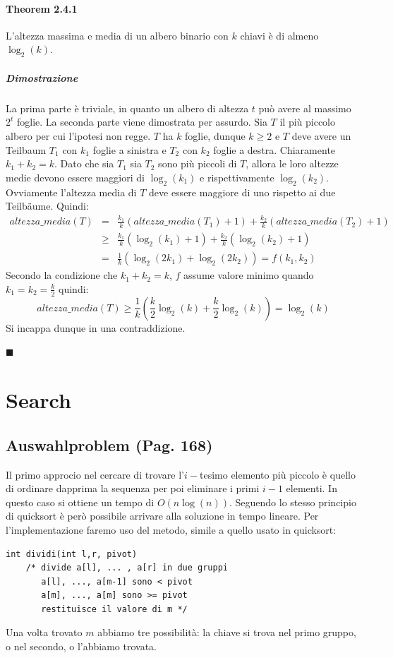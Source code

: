 \documentclass[a4paper]{book}
\newenvironment{mytheorem}[1]{\subsubsection*{Theorem #1}}{\begin{flushright}$\blacksquare$\end{flushright}}
\newcommand{\lstIndent}{4}
\begin{document}
\begin{mytheorem}{2.4.1}
L'altezza massima e media di un albero binario con $k$ chiavi è di almeno $ \log_2 (k)$.
\paragraph*{Dimostrazione}
La prima parte è triviale, in quanto un albero di altezza $t$ può avere al massimo $2^t$ foglie. La seconda parte viene dimostrata per assurdo. Sia $T$ il più piccolo albero per cui l'ipotesi non regge. $T$ ha $k$ foglie, dunque $k \geq 2$ e $T$ deve avere un Teilbaum $T_1$ con $k_1$ foglie a sinistra e $T_2$ con $k_2$ foglie a destra. Chiaramente $k_1+k_2=k$. Dato che sia $T_1$ sia $T_2$ sono più piccoli di $T$, allora le loro altezze medie devono essere maggiori di $\log_2(k_1)$ e rispettivamente $\log_2 (k_2)$. Ovviamente l'altezza media di $T$ deve essere maggiore di uno rispetto ai due Teilbäume. Quindi:
\begin{eqnarray}
 altezza\_media(T) &=&  \frac{k_1}{k}(altezza\_media(T_1)+1)+\frac{k_2}{k}(altezza\_media(T_2)+1)      \nonumber \\
   &\geq & \frac{k_1}{k}(\log_2(k_1)+1)+\frac{k_2}{k}(\log_2(k_2)+1) \nonumber \\
   &=&\frac{1}{k}(\log_2(2k_1)+\log_2(2k_2)) = f(k_1,k_2)
\end{eqnarray}
Secondo la condizione che $k_1+k_2=k$, $f$ assume valore minimo quando $k_1=k_2=\frac{k}{2}$ quindi:
$$ altezza\_media(T) \geq \frac{1}{k}\left(\frac{k}{2} \log_2(k)+\frac{k}{2} \log_2(k)\right)=\log_2 (k)$$
Si incappa dunque in una contraddizione.
\end{mytheorem}
\chapter{Search}
\section{Auswahlproblem (Pag. 168)}
Il primo approcio nel cercare di trovare l'$i-$tesimo elemento più piccolo è quello di ordinare dapprima la sequenza per poi eliminare i primi $i-1$ elementi. In questo caso si ottiene un tempo di $O(n \log (n))$. Seguendo lo stesso principio di quicksort è però possibile arrivare alla soluzione in tempo lineare. Per l'implementazione faremo uso del metodo, simile a quello usato in quicksort:
\begin{lstlisting}[tabsize=\lstIndent]
int dividi(int l,r, pivot)
	/* divide a[l], ... , a[r] in due gruppi
	   a[l], ..., a[m-1] sono < pivot
	   a[m], ..., a[m] sono >= pivot
	   restituisce il valore di m */
\end{lstlisting}
Una volta trovato $m$ abbiamo tre possibilità: la chiave si trova nel primo gruppo, o nel secondo, o l'abbiamo trovata.
\end{document}

